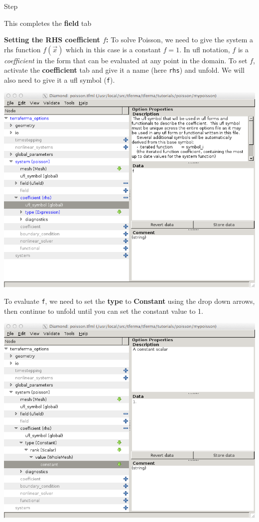 \begin{steps}{Step}
\begin{center}
\end{center}
This completes the \textbf{field} tab
\item \textbf{Setting the RHS coefficient $f$:} To solve Poisson, we
  need to give the system a rhs function $f(\vec{x})$ which in this
  case is a constant $f=1$.  In ufl notation,  $f$ is a
  \emph{coefficient} in the form that can be evaluated at any point in
  the domain.  To set $f$, activate the \textbf{coefficient} tab and
  give it a name (here \texttt{rhs}) and unfold. We will also need to
  give it a  ufl symbol (\texttt{f}). 
\begin{center}
    \includegraphics[width=\diamondwidth]{figures/screendumps/diamond_poisson_10b.png}
\end{center}
 To evaluate \texttt{f}, we need to set the \textbf{type} to
\textbf{Constant} using the drop down arrows, then continue to unfold
until you can set the constant value to 1.
\begin{center}
    \includegraphics[width=\diamondwidth]{figures/screendumps/diamond_poisson_10c.png}

\end{center}
\end{steps}
